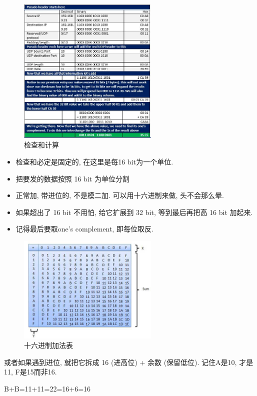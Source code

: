\documentclass[a4paper]{report}
\begin{document}
\begin{figure}[H]
\centering
\includegraphics[width=0.6\textwidth]{udp_checksum.jpg}
\caption{检查和计算}
\end{figure}
\begin{itemize}
  \item 检查和必定是固定的, 在这里是每16 bit为一个单位. 
  \item 把要发的数据按照 16 bit 为单位分割
  \item 正常加, 带进位的, 不是模二加. 可以用十六进制来做, 头不会那么晕. 
  \item 如果超出了 16 bit 不用怕, 给它扩展到 32 bit, 等到最后再把高 16 bit 加起来. 
  \item 记得最后要取one's complement, 即每位取反. 
\end{itemize}

\begin{figure}[H]
\centering
\includegraphics[width=0.6\textwidth]{hex_add_table.jpg}
\caption{十六进制加法表}
\end{figure}
或者如果遇到进位, 就把它拆成 16 (进高位) + 余数 (保留低位). 记住A是10, 才是11, F是15而非16. 

B+B=11+11=22=16+6=16
\end{document}
